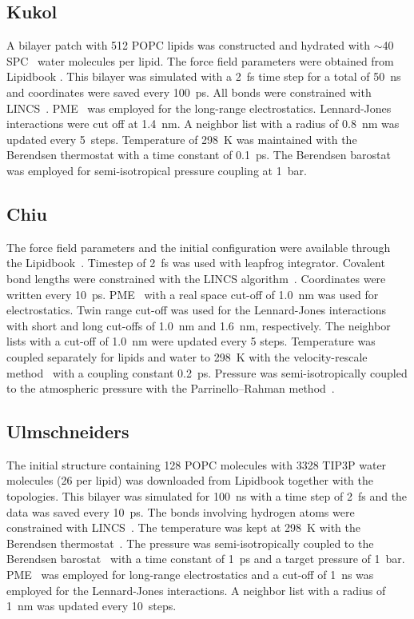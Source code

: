 \documentclass[journal=jacsat,manuscript=article]{achemso}
\begin{document}
\subsection{Kukol}
A bilayer patch with 512 POPC lipids was constructed and hydrated with $\sim$40 SPC~\cite{berendsen81} water molecules per lipid. 
The force field parameters were obtained from Lipidbook \cite{domanski10}.
This bilayer was simulated with a 2~fs time step for a total of 50~ns and coordinates were saved every 100~ps. 
All bonds were constrained with LINCS~\cite{hess97,hess07}. PME~\cite{darden93,essman95} was employed for the long-range electrostatics. Lennard-Jones interactions 
were cut off at 1.4~nm. A neighbor list with a radius of 0.8~nm was updated every 5~steps. Temperature of 298~K 
was maintained with the Berendsen thermostat \cite{berendsen84} with a time constant of 0.1~ps. The Berendsen barostat \cite{berendsen84} 
was employed for semi-isotropical pressure coupling at 1~bar.

\subsection{Chiu}
The force field parameters and the initial configuration were available through the Lipidbook~\cite{domanski10}.
Timestep of 2~fs was used with leapfrog integrator. Covalent bond lengths were constrained with the LINCS algorithm~\cite{hess97,hess07}. 
Coordinates were written every 10~ps. PME~\cite{darden93,essman95} with a real space cut-off of 1.0~nm was used 
for electrostatics. Twin range cut-off was used for the Lennard-Jones interactions with short and long cut-offs of 1.0~nm and 1.6~nm, respectively.
The neighbor lists with a cut-off of 1.0~nm were updated every 5 steps. Temperature was coupled separately
for lipids and water to 298~K with the velocity-rescale method~\cite{bussi07} with a coupling constant 0.2~ps.
Pressure was semi-isotropically coupled to the atmospheric pressure with the Parrinello--Rahman method~\cite{parrinello81}.

\subsection{Ulmschneiders}
The initial structure containing 128 POPC molecules with 3328 TIP3P water~\cite{jorgensen83} molecules (26 per lipid) was downloaded from Lipidbook \cite{domanski10} 
together with the topologies. This bilayer was simulated for 100~ns with a time step of 2~fs and the data was saved every 10~ps. The bonds involving hydrogen atoms were 
constrained with LINCS~\cite{hess97,hess07}. The temperature was kept at 298~K with the Berendsen thermostat~\cite{berendsen84}. The pressure was semi-isotropically coupled to the Berendsen 
barostat~\cite{berendsen84} with a time constant of 1~ps and a target pressure of 1~bar. PME~\cite{darden93,essman95} was employed for long-range electrostatics and a cut-off of 1~ns was employed for 
the Lennard-Jones interactions. A neighbor list with a radius of 1~nm was updated every 10~steps. 
\end{document}
